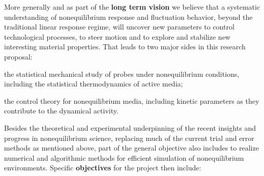 %
More generally and as part of the {\bf long term vision} we believe that a systematic
understanding of nonequilibrium response and fluctuation behavior, beyond the traditional
linear response regime, will uncover new parameters to control technological processes, to
steer motion and to explore and stabilize new interesting material properties.
%
That leads to two major sides in this research proposal:
\begin{inparaenum}[A.]
\item the statistical mechanical study of probes under nonequilibrium conditions, including
the statistical thermodynamics of active media;
\item the control theory for nonequilibrium media, including kinetic parameters as they
contribute to the dynamical activity.
\end{inparaenum}
Besides the theoretical and experimental underpinning of the recent insights and progress in
nonequilibrium science, replacing much of the current trial and error methods as mentioned
above, part of the general objective also includes to realize numerical and algorithmic
methods for efficient simulation of nonequilibrium environments. Specific {\bf objectives}
for the project then include:
